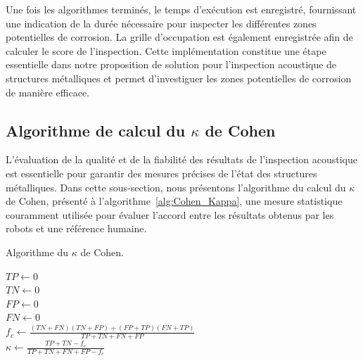 \documentclass[francais,RandD]{rapportPFE}
\begin{document}
			Une fois les algorithmes terminés, le temps d'exécution est enregistré, fournissant une indication de la durée nécessaire pour inspecter les différentes zones potentielles de corrosion.
			La grille d'occupation est également enregistrée afin de calculer le score de l'inspection.
			Cette implémentation constitue une étape essentielle dans notre proposition de solution pour l'inspection acoustique de structures métalliques et permet d'investiguer les zones potentielles de corrosion de manière efficace.
		\subsection*{Algorithme de calcul du $\kappa$ de Cohen}
			L'évaluation de la qualité et de la fiabilité des résultats de l'inspection acoustique est essentielle pour garantir des mesures précises de l'état des structures métalliques.
			Dans cette sous-section, nous présentons l'algorithme du calcul du $\kappa$ de Cohen, présenté à l'algorithme~\ref{alg:Cohen_Kappa}, une mesure statistique couramment utilisée pour évaluer l'accord entre les résultats obtenus par les robots et une référence humaine.

			\begin{algorithm}[h!]
				\caption{Algorithme du $\kappa$ de Cohen.}
				\label{alg:Cohen_Kappa}
				\KwResult{$\kappa \in [0, 1]$}
				$TP \gets 0$ \\
				$TN \gets 0$ \\
				$FP \gets 0$ \\
				$FN \gets 0$ \\
				$f_c \gets \frac{(TN + FN) (TN + FP) + (FP + TP) (FN + TP)}{TP + TN + FN +FP}$ \\
				$\kappa \gets \frac{TP + TN - f_c}{TP + TN + FN + FP - f_c}$
			\end{algorithm}
\end{document}
